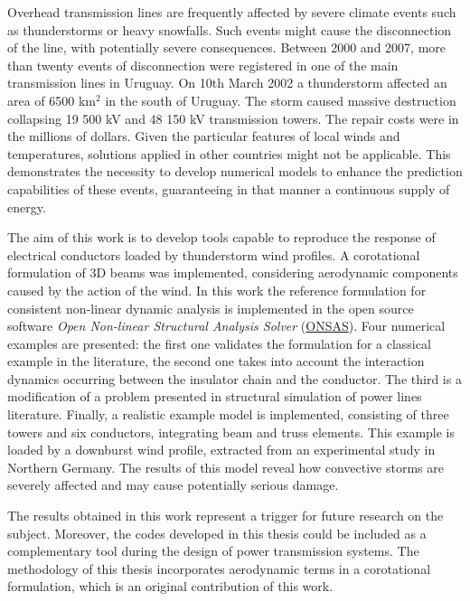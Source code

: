 \begin{foreignabstract}
Overhead transmission lines are frequently affected by severe climate events such as thunderstorms or heavy snowfalls. Such events might cause the disconnection of the line, with potentially severe consequences. Between 2000 and 2007, more than twenty events of disconnection were registered in one of the main transmission lines in Uruguay. On 10th March 2002 a thunderstorm affected an area of 6500 km$^2$ in the south of Uruguay. The storm caused massive destruction collapsing 19 500 kV and 48 150 kV transmission towers. The repair costs were in the millions of dollars. Given the particular features of local winds and temperatures, solutions applied in other countries might not be applicable. This demonstrates the necessity to develop numerical models to enhance the prediction capabilities of these events, guaranteeing in that manner a continuous supply of energy.

The aim of this work is to develop tools capable to reproduce the response of electrical conductors loaded by  thunderstorm wind profiles. A corotational formulation of 3D beams was implemented, considering aerodynamic components caused by the action of the wind. In this work the reference formulation for consistent non-linear dynamic analysis is implemented in the open source software \emph{Open Non-linear Structural Analysis Solver} (\href{https://github.com/ONSAS/ONSAS.m/}{ONSAS}). Four numerical examples are presented: the first one validates the formulation for a classical example in the literature, the second one takes into account the interaction dynamics occurring between the insulator chain and the conductor. The third is a modification of a problem presented in structural simulation of power lines literature.  Finally, a realistic example model is implemented, consisting of three towers and six conductors, integrating beam and truss elements. This example is loaded by a downburst wind profile,  extracted from an experimental study in Northern Germany. The results of this model reveal how convective storms are severely affected and may cause potentially serious damage.

The results obtained in this work represent a trigger for future research on the subject. Moreover, the codes developed in this thesis could be included as a complementary tool during the design of power transmission systems. The methodology of this thesis incorporates aerodynamic terms in a corotational formulation, which is an original contribution of this work.  

\end{foreignabstract}